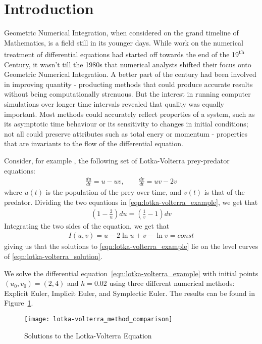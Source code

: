 \documentclass[../Main.tex]{subfiles}
\begin{document}
\section{Introduction}

Geometric Numerical Integration, when considered on the grand timeline of Mathematics, is a field still in its younger days. While work on the numerical treatment of differential equations had started off towards the end of the 19\textsuperscript{th} Century, it wasn't till the 1980s that numerical analysts shifted their focus onto Geometric Numerical Integration.  A  better part of the century had been involved in improving quantity -  producting methods that could produce accurate results without being computationally strenuous. But the interest in running computer simulations over longer time intervals revealed that quality was equally important. Most methods could accurately reflect properties of a system, such as its asymptotic time behaviour or its sensitivity to changes in initial conditions; not all could preserve attributes such as total enery or momentum - properties that are invariants to the flow of the differential equation.

Consider, for example \cite{Hairer2006}, the following set of Lotka-Volterra prey-predator equations:
\begin{align}
	\frac{du}{dt} = u - uv, \qquad \frac{dv}{dt} = uv - 2v \label{eqn:lotka-volterra_example}
\end{align} where $u(t)$ is the population of the prey over time, and $v(t)$ is that of the predator. Dividing the two equations in \ref{eqn:lotka-volterra_example}, we get that
\begin{align*}
\left(1 -  \frac{2}{u}\right) du = \left(\frac{1}{v} - 1\right) dv
\end{align*}
Integrating the two sides of the equation, we get that
\begin{align}
I(u, v) = u - 2\ln{u} +  v - \ln{v} = const \label{eqn:lotka-volterra_solution}
\end{align}
giving us that the solutions to \ref{eqn:lotka-volterra_example} lie on the level curves of \ref{eqn:lotka-volterra_solution}.

We solve the differential equation~\ref{eqn:lotka-volterra_example} with initial points $(u_0, v_0) = (2, 4)$ and $h = 0.02$ using three different numerical methods: Explicit Euler, Implicit Euler, and Symplectic Euler. The results can be found in Figure~\ref{fig:lotka-volterra_solutions}. 
\begin{figure}[H]
\texttt{[image: lotka-volterra\_method\_comparison]}
\centering
\caption{Solutions to the Lotka-Volterra Equation}
\label{fig:lotka-volterra_solutions}
\end{figure}
\end{document}
